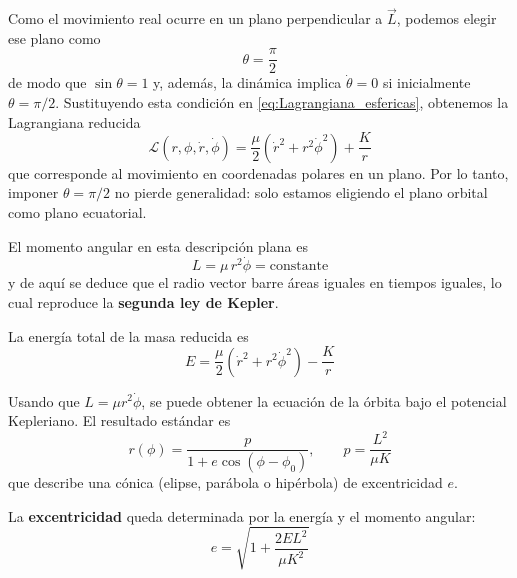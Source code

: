 \documentclass{article}
\begin{document}
Como el movimiento real ocurre en un plano perpendicular a \(\vec L\),
podemos elegir ese plano como
\[
\theta = \frac{\pi}{2}
\]
de modo que \(\sin\theta = 1\) y, además, la dinámica implica \(\dot{\theta}=0\)
si inicialmente \(\theta=\pi/2\). Sustituyendo esta condición en
\eqref{eq:Lagrangiana_esfericas}, obtenemos la Lagrangiana reducida
\begin{equation}
\boxed{
\mathcal{L}(r,\phi,\dot r,\dot{\phi})
= \frac{\mu}{2}\left(
\dot r^{2} + r^{2}\dot{\phi}^{2}
\right)
+ \frac{K}{r}
}
\label{eq:Lagrangiana_plana}
\end{equation}
que corresponde al movimiento en coordenadas polares en un plano.
Por lo tanto, imponer \(\theta=\pi/2\) no pierde generalidad: solo estamos
eligiendo el plano orbital como plano ecuatorial.

El momento angular en esta descripción plana es
\begin{equation}
L = \mu\,r^{2}\dot{\phi} = \text{constante}
\label{eq:L_constante}
\end{equation}
y de aquí se deduce que el radio vector barre áreas iguales en tiempos iguales,
lo cual reproduce la \textcolor{vividviolet}{\textbf{segunda ley de Kepler}}.

\vspace{0.4cm}


La energía total de la masa reducida es
\begin{equation}
E
= \frac{\mu}{2}\left(\dot r^{2} + r^{2}\dot{\phi}^{2}\right)
 - \frac{K}{r}
\label{eq:energia_total}
\end{equation}

Usando que \(L=\mu r^{2}\dot{\phi}\), se puede obtener la ecuación de la órbita
bajo el potencial Kepleriano. El resultado estándar es
\begin{equation}
\boxed{
r(\phi)
= \frac{p}{1 + e\cos(\phi-\phi_{0})},
\qquad
p = \frac{L^{2}}{\mu K}
}
\label{eq:orbita_conica}
\end{equation}
que describe una cónica (elipse, parábola o hipérbola) de excentricidad \(e\).

La \textcolor{Lochinvar}{\textbf{excentricidad}} queda determinada por la energía y el momento angular:
\begin{equation}
\boxed{
e
= \sqrt{1 + \frac{2EL^{2}}{\mu K^{2}}}
}
\label{eq:excentricidad_EL}
\end{equation}
\end{document}
